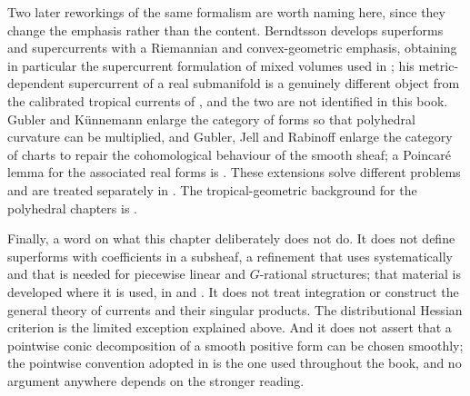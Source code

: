 Two later reworkings of the same formalism are worth naming here, since they
change the emphasis rather than the content.  Berndtsson
\cite{Ber19Super,Ber26Convex} develops superforms and supercurrents with a
Riemannian and convex-geometric emphasis, obtaining in particular the
supercurrent formulation of mixed volumes used in
; his metric-dependent supercurrent of a real
submanifold is a genuinely different object from the calibrated tropical
currents of , and the two are not identified
in this book.  Gubler and K\"unnemann \cite{GK17,GK19} enlarge the category
of forms so that polyhedral curvature can be multiplied, and Gubler, Jell and
Rabinoff \cite{GJR26} enlarge the category of charts to repair the
cohomological behaviour of the smooth sheaf; a Poincar\'e lemma for the
associated real forms is \cite{Jell16}.  These extensions solve different
problems and are treated separately in .  The
tropical-geometric background for the polyhedral chapters is
\cite{MR18Tropical}.

Finally, a word on what this chapter deliberately does not do.  It does not
define superforms with coefficients in a subsheaf, a refinement that
\cite{CLD25} uses systematically and that is needed for piecewise linear and
$G$-rational structures; that material is developed where it is used, in
 and .  It does not
treat integration or construct the general theory of currents and their
singular products.  The distributional Hessian criterion is the limited
exception explained above.  And it does not assert
that a pointwise conic decomposition of a smooth positive form can be chosen
smoothly; the pointwise convention adopted in
 is the one used throughout the book, and no
argument anywhere depends on the stronger reading.
